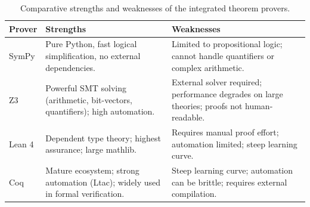 \begin{table}[htbp]
\centering
\caption{Comparative strengths and weaknesses of the integrated theorem provers.}
\label{tab:prover_comparison}
\begin{tabular}{p{2.2cm} p{3.5cm} p{3.5cm}}
\toprule
\textbf{Prover} & \textbf{Strengths} & \textbf{Weaknesses} \\
\midrule
SymPy & Pure Python, fast logical simplification, no external dependencies. & Limited to propositional logic; cannot handle quantifiers or complex arithmetic. \\
Z3 & Powerful SMT solving (arithmetic, bit-vectors, quantifiers); high automation. & External solver required; performance degrades on large theories; proofs not human-readable. \\
Lean 4 & Dependent type theory; highest assurance; large mathlib. & Requires manual proof effort; automation limited; steep learning curve. \\
Coq & Mature ecosystem; strong automation (Ltac); widely used in formal verification. & Steep learning curve; automation can be brittle; requires external compilation. \\
\bottomrule
\end{tabular}
\end{table}